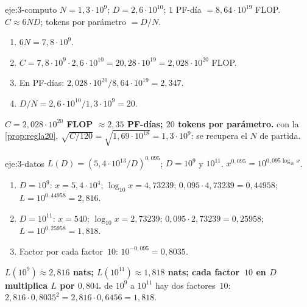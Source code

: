 \begin{solucion}{eje:3-computo}
\datos $N=1{,}3\cdot 10^{9}$; $D=2{,}6\cdot 10^{10}$; $1$ PF-día $=8{,}64\cdot 10^{19}$ FLOP.
\planteamiento $C\approx 6ND$; tokens por parámetro $=D/N$.
\pasos
\begin{enumerate}[label=\arabic*.]
  \item $6N=7{,}8\cdot 10^{9}$.
  \item $C=7{,}8\cdot 10^{9}\cdot 2{,}6\cdot 10^{10}=20{,}28\cdot 10^{19}=2{,}028\cdot 10^{20}$ FLOP.
  \item En PF-días: $2{,}028\cdot 10^{20}/8{,}64\cdot 10^{19}=2{,}347$.
  \item $D/N=2{,}6\cdot 10^{10}/1{,}3\cdot 10^{9}=20$.
\end{enumerate}
\resultado \textbf{$C=2{,}028\cdot 10^{20}$ FLOP $\approx 2{,}35$ PF-días; $20$ tokens por parámetro.}
\comprobacion con la \cref{prop:regla20}, $\sqrt{C/120}=\sqrt{1{,}69\cdot 10^{18}}=1{,}3\cdot 10^{9}$: se recupera el $N$ de partida.
\end{solucion}

\begin{solucion}{eje:3-datos}
\datos $L(D)=(5{,}4\cdot 10^{13}/D)^{0{,}095}$; $D=10^{9}$ y $10^{11}$.
\planteamiento $x^{0{,}095}=10^{0{,}095\log_{10}x}$.
\pasos
\begin{enumerate}[label=\arabic*.]
  \item $D=10^{9}$: $x=5{,}4\cdot 10^{4}$; $\log_{10}x=4{,}73239$; $0{,}095\cdot 4{,}73239=0{,}44958$; $L=10^{0{,}44958}=2{,}816$.
  \item $D=10^{11}$: $x=540$; $\log_{10}x=2{,}73239$; $0{,}095\cdot 2{,}73239=0{,}25958$; $L=10^{0{,}25958}=1{,}818$.
  \item Factor por cada factor~$10$: $10^{-0{,}095}=0{,}8035$.
\end{enumerate}
\resultado \textbf{$L(10^{9})\approx 2{,}816$ nats; $L(10^{11})\approx 1{,}818$ nats; cada factor~$10$ en $D$ multiplica $L$ por $0{,}804$.}
\comprobacion de $10^{9}$ a $10^{11}$ hay dos factores~$10$: $2{,}816\cdot 0{,}8035^{2}=2{,}816\cdot 0{,}6456=1{,}818$.
\end{solucion}

